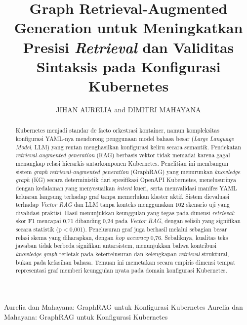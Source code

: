 \documentclass{ieeeaccess}
\begin{document}

\title{Graph Retrieval-Augmented Generation untuk Meningkatkan Presisi \textit{Retrieval} dan Validitas Sintaksis pada Konfigurasi Kubernetes}

\author{\uppercase{Jihan Aurelia} and \uppercase{Dimitri Mahayana}}
\address[1]{School of Electrical Engineering and Informatics, Institut Teknologi Bandung, Bandung 40132, Indonesia}

\markboth
{Aurelia dan Mahayana: GraphRAG untuk Konfigurasi Kubernetes}
{Aurelia dan Mahayana: GraphRAG untuk Konfigurasi Kubernetes}


\titlepgskip=-15pt

\maketitle

\begin{abstract}
Kubernetes menjadi standar de facto orkestrasi kontainer, namun kompleksitas konfigurasi YAML-nya mendorong penggunaan model bahasa besar (\textit{Large Language Model}, LLM) yang rentan menghasilkan konfigurasi keliru secara semantik. Pendekatan \textit{retrieval-augmented generation} (RAG) berbasis vektor tidak memadai karena gagal menangkap relasi hierarkis antarkomponen Kubernetes. Penelitian ini membangun sistem \textit{graph retrieval-augmented generation} (GraphRAG) yang menurunkan \textit{knowledge graph} (KG) secara deterministik dari spesifikasi OpenAPI Kubernetes, menelusurinya dengan kedalaman yang menyesuaikan \textit{intent} kueri, serta memvalidasi manifes YAML keluaran langsung terhadap graf tanpa memerlukan klaster aktif. Sistem dievaluasi terhadap \textit{Vector RAG} dan LLM tanpa konteks menggunakan 102 skenario uji yang divalidasi praktisi. Hasil menunjukkan keunggulan yang tegas pada dimensi \textit{retrieval}: skor F1 mencapai 0,71 dibanding 0,24 pada \textit{Vector RAG}, dengan selisih yang signifikan secara statistik (p$<$0,001). Penelusuran graf juga berhasil melalui sebagian besar relasi skema yang diharapkan, dengan \textit{hop accuracy} 0,76. Sebaliknya, kualitas teks jawaban tidak berbeda signifikan antarsistem, menunjukkan bahwa kontribusi \textit{knowledge graph} terletak pada ketertelusuran dan kelengkapan \textit{retrieval} struktural, bukan pada kefasihan bahasa. Temuan ini memetakan secara empiris dimensi tempat representasi graf memberi keunggulan nyata pada domain konfigurasi Kubernetes.
\end{abstract}
\end{document}
